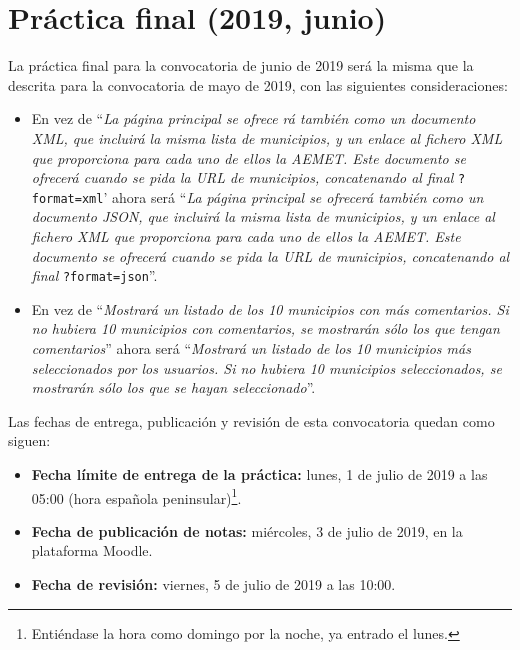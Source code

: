 \section{Práctica final (2019, junio)}
\label{practica-final-2019-06}

La práctica final para la convocatoria de junio de 2019 será la misma que la descrita para la convocatoria de mayo de 2019, con las siguientes consideraciones:

\begin{itemize}
  \item En vez de ``\emph{La página principal se ofrece rá también como un documento XML, que incluirá la misma lista de municipios, y un enlace al fichero XML que proporciona para cada uno de ellos la AEMET. Este documento se ofrecerá cuando se pida la URL de municipios, concatenando al final} \verb|?format=xml|' ahora será ``\emph{La página principal se ofrecerá también como un documento JSON, que incluirá la misma lista de municipios, y un enlace al fichero XML que proporciona para cada uno de ellos la AEMET. Este documento se ofrecerá cuando se pida la URL de municipios, concatenando al final} \verb|?format=json|''.
  \item En vez de ``\emph{Mostrará un listado de los 10 municipios con más comentarios. Si no hubiera 10 municipios con comentarios, se mostrarán sólo los que tengan comentarios}'' ahora será ``\emph{Mostrará un listado de los 10 municipios más seleccionados por los usuarios. Si no hubiera 10 municipios seleccionados, se mostrarán sólo los que se hayan seleccionado}''.
\end{itemize}

Las fechas de entrega, publicación y revisión de esta convocatoria quedan como siguen:

\begin{itemize}
  \item \textbf{Fecha límite de entrega de la práctica:} lunes, 1 de julio de 2019 a las 05:00 (hora española peninsular)\footnote{Entiéndase la hora como domingo por la noche, ya entrado el lunes.}.

  \item \textbf{Fecha de publicación de notas:} miércoles, 3 de julio de 2019, en la plataforma Moodle.

  \item \textbf{Fecha de revisión:} viernes, 5 de julio de 2019 a las 10:00.

\end{itemize}


